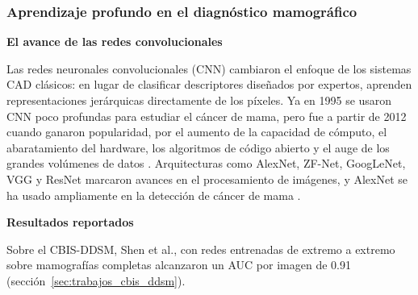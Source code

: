 
\subsubsection{Aprendizaje profundo en el diagnóstico mamográfico}

\textbf{El avance de las redes convolucionales}

Las redes neuronales convolucionales (CNN) cambiaron el enfoque de los sistemas CAD clásicos: en lugar de clasificar descriptores diseñados por expertos, aprenden representaciones jerárquicas directamente de los píxeles.
Ya en 1995 se usaron CNN poco profundas para estudiar el cáncer de mama, pero fue a partir de 2012 cuando ganaron popularidad, por el aumento de la capacidad de cómputo, el abaratamiento del hardware, los algoritmos de código abierto y el auge de los grandes volúmenes de datos \cite{Abdelhafiz2019DeepCNN}.
Arquitecturas como AlexNet, ZF-Net, GoogLeNet, VGG y ResNet marcaron avances en el procesamiento de imágenes, y AlexNet se ha usado ampliamente en la detección de cáncer de mama \cite{Abdelhafiz2019DeepCNN}.

\textbf{Resultados reportados}

Sobre el CBIS-DDSM, Shen et al., con redes entrenadas de extremo a extremo sobre mamografías completas alcanzaron un AUC por imagen de 0.91 \cite{Shen2019DeepLearning} (sección~\ref{sec:trabajos_cbis_ddsm}).

